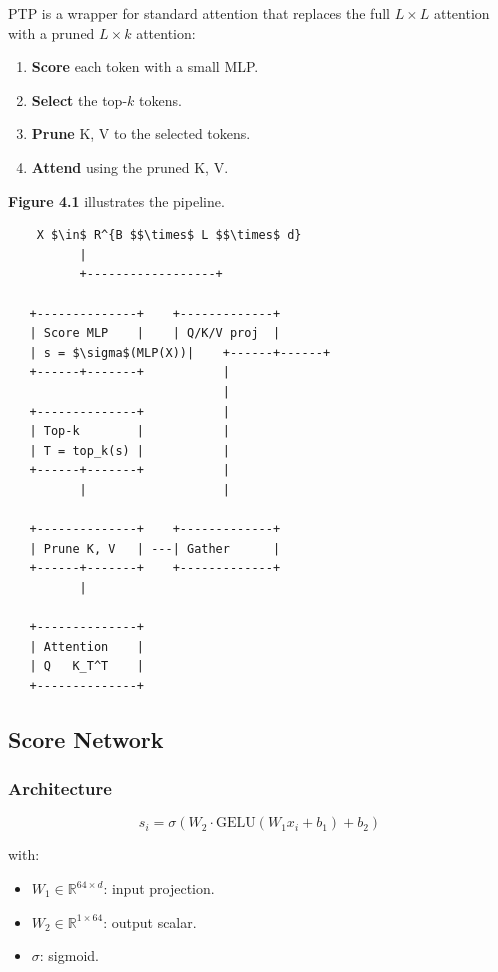 {PTP is a wrapper for standard attention that replaces the full $L \times L$ 
attention with a pruned $L \times k$ attention:

\begin{enumerate}
\item \textbf{Score} each token with a small MLP.
\item \textbf{Select} the top-$k$ tokens.
\item \textbf{Prune} K, V to the selected tokens.
\item \textbf{Attend} using the pruned K, V.

\end{enumerate}
\textbf{Figure 4.1} illustrates the pipeline.

\begin{lstlisting}
    X $\in$ R^{B $$\times$ L $$\times$ d}
          |
          +------------------+
                              
   +--------------+    +-------------+
   | Score MLP    |    | Q/K/V proj  |
   | s = $\sigma$(MLP(X))|    +------+------+
   +------+-------+           |
                              |
   +--------------+           |
   | Top-k        |           |
   | T = top_k(s) |           |
   +------+-------+           |
          |                   |
                               
   +--------------+    +-------------+
   | Prune K, V   | ---| Gather      |
   +------+-------+    +-------------+
          |
           
   +--------------+
   | Attention    |
   | Q   K_T^T    |
   +--------------+
\end{lstlisting}

\subsection{Score Network}

\subsubsection{Architecture}

\[
s_i = \sigma\!\left(W_2 \cdot \text{GELU}(W_1 x_i + b_1) + b_2\right)
\tag{4.1}
\]

with:
\begin{itemize}
\item $W_1 \in \mathbb{R}^{64 \times d}$: input projection.
\item $W_2 \in \mathbb{R}^{1 \times 64}$: output scalar.
\item $\sigma$: sigmoid.


\end{itemize}}
